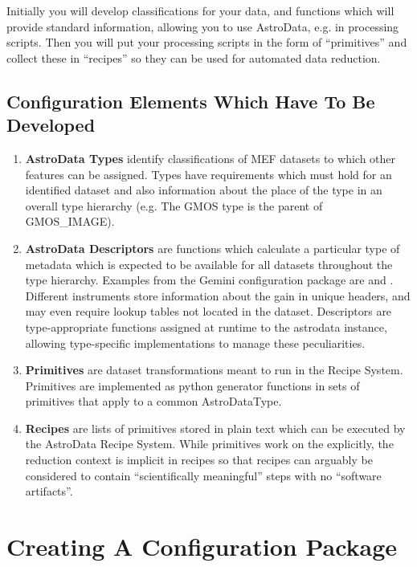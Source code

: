 \documentclass[letterpaper,10pt,english]{sphinxmanual}
\begin{document}
Initially you will develop classifications
for your data, and functions which will provide standard information, allowing
you to use AstroData, e.g. in processing scripts.  Then you will put your
processing scripts in the form of ``primitives'' and collect these in ``recipes''
so they can be used for automated data reduction.


\subsection{Configuration Elements Which Have To Be  Developed}
\label{configElements:configuration-elements-which-have-to-be-developed}\begin{enumerate}
\item {} 
\textbf{AstroData Types} identify classifications of MEF datasets to which other
features can be assigned. Types have requirements which must hold for
an identified dataset and also information about the place of the type in
an overall type hierarchy (e.g. The GMOS type is the parent of GMOS\_IMAGE).

\item {} 
\textbf{AstroData Descriptors} are functions which calculate a particular type
of metadata which is expected to be available for all datasets throughout
the type hierarchy. Examples from the Gemini configuration package are 
and .  Different instruments
store information about the gain in unique headers, and may even require
lookup tables not located in the dataset.  Descriptors are type-appropriate
functions assigned at runtime to the astrodata instance, allowing
type-specific implementations to manage these peculiarities.

\item {} 
\textbf{Primitives} are dataset transformations meant to run in the Recipe System.
Primitives are implemented as python generator functions in sets of primitives
that apply to a common AstroDataType.

\item {} 
\textbf{Recipes} are lists of primitives stored in plain text which can be executed
by the AstroData Recipe System. While primitives work on the  explicitly, the reduction context is implicit in recipes
so that recipes can arguably be considered to contain
``scientifically meaningful'' steps with no ``software artifacts''.

\end{enumerate}


\section{Creating A Configuration Package}
\label{startingTheConfig:creating-a-configuration-package}\label{startingTheConfig::doc}
\end{document}
